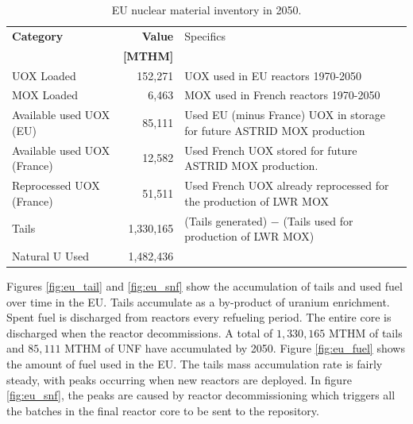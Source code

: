 \begin{table}[h]
	\centering
        \caption{\gls{EU} nuclear material inventory in 2050.}
\begin{tabularx}{\textwidth}{XrX}
			\hline
                        \textbf{Category} & \textbf{Value} & Specifics \\
                                          & \textbf{[MTHM]} & \\ \hline
                        UOX Loaded  & 152,271 & UOX used in EU reactors 1970-2050\\ 
			MOX Loaded  & 6,463  & MOX used in French reactors 1970-2050\\
                        Available used UOX (EU)  & 85,111  & Used EU (minus France) 
                                UOX in storage for future ASTRID MOX 
                                production\\
                        Available used UOX (France) & 
                                12,582  & Used French UOX stored for 
                                future ASTRID MOX production. \\
                                Reprocessed UOX (France) & 51,511 & Used French UOX already reprocessed for the production of LWR MOX \\
			Tails  & 1,330,165  & (Tails generated) $-$ (Tails used for production of LWR MOX) \\ 
			Natural U Used  & 1,482,436  & \\ \hline
		\end{tabularx}
		
		\label{tab:sim_result1}
\end {table}
\FloatBarrier


Figures \ref{fig:eu_tail} and \ref{fig:eu_snf} show the 
accumulation of tails and used fuel over time in the \gls{EU}.
Tails accumulate as a by-product of uranium enrichment. 
Spent fuel is discharged from reactors every refueling period.
The entire core is discharged when the reactor decommissions.
A total of $1,330,165$ MTHM of tails and $85,111$ MTHM of
\gls{UNF} have accumulated by 2050.
Figure \ref{fig:eu_fuel} shows the amount of fuel used in the \gls{EU}. The 
tails mass accumulation rate is fairly steady, with peaks occurring when new 
reactors are deployed.
In figure \ref{fig:eu_snf}, the peaks are caused by reactor decommissioning which 
triggers all the batches in the final reactor core to be sent to the repository.

